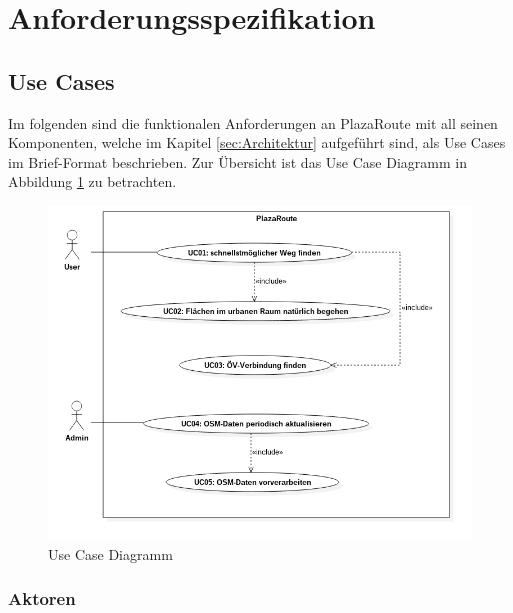 \section{Anforderungsspezifikation}
\label{sec:Anforderungsspezifikation}

\subsection{Use Cases}
\label{sub:Use Cases}
Im folgenden sind die funktionalen Anforderungen an PlazaRoute mit all seinen Komponenten, welche im Kapitel \ref{sec:Architektur} aufgeführt sind, als Use Cases im Brief-Format beschrieben. Zur Übersicht ist das Use Case Diagramm in Abbildung \ref{fig:usecase_diagram} zu betrachten.

\begin{figure}[ht]
\centering
\includegraphics[width=1\linewidth]{projectdoc/img/usecase_diagram}
\caption[Use Case Diagramm]{Use Case Diagramm}
\label{fig:usecase_diagram}
\end{figure}

\subsubsection{Aktoren}
\label{useccase:Aktoren}


